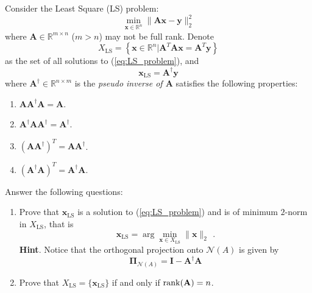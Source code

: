 \documentclass[english,onecolumn]{IEEEtran}
\begin{document}
Consider the Least Square (LS) problem:
\begin{equation}
    \label{eq:LS_problem}
    \min_{\mathbf{x}\in\mathbb{R}^n}\|\mathbf{A}\mathbf{x}-\mathbf{y}\|_2^2
\end{equation}
where $\mathbf{A}\in\mathbb{R}^{m\times n}$ ($m>n$) may not be full rank. Denote 
\begin{equation*}
    X_{\mathrm{LS}}=\left\{\mathbf{x}\in\mathbb{R}^n| \mathbf{A}^T\mathbf{A}\mathbf{x}=\mathbf{A}^T\mathbf{y}\right\}
\end{equation*}
as the set of all solutions to (\ref{eq:LS_problem}), and 
\begin{equation*}
    \mathbf{x}_{\mathrm{LS}}=\mathbf{A}^\dagger \mathbf{y}
\end{equation*}
where $\mathbf{A}^\dagger\in\mathbb{R}^{n\times m}$ is the \emph{pseudo inverse of $\mathbf{A}$} satisfies the following properties:
\begin{enumerate}
    \item $\mathbf{A}\mathbf{A}^\dagger\mathbf{A}=\mathbf{A}$.
    \item $\mathbf{A}^\dagger\mathbf{A}\mathbf{A}^\dagger=\mathbf{A}^\dagger$.
    \item $(\mathbf{A}\mathbf{A}^\dagger)^T=\mathbf{A}\mathbf{A}^\dagger$.
    \item $(\mathbf{A}^\dagger\mathbf{A})^T=\mathbf{A}^\dagger\mathbf{A}$.
\end{enumerate}

Answer the following questions:
\begin{enumerate}
    \item Prove that $\mathbf{x}_{\mathrm{LS}}$ is a solution to (\ref{eq:LS_problem}) and is of minimum $2$-norm in $X_{\mathrm{LS}}$, that is
    \begin{equation*}
        \mathbf{x}_{\mathrm{LS}}=\arg\min_{\mathbf{x}\in X_{\mathrm{LS}}}\|\mathbf{x}\|_2\  \,.
    \end{equation*}
    \textbf{Hint}. Notice that the orthogonal projection onto $\mathcal{N}(A)$ is given by
    \begin{equation*}
        \mathbf{\Pi}_{\mathcal{N}(A)}=\mathbf{I}-\mathbf{A}^\dagger\mathbf{A}
    \end{equation*}
    
    \item Prove that $X_{\mathrm{LS}}=\{\mathbf{x}_{\mathrm{LS}}\}$ if and only if $\mathrm{rank}({\bf A})=n$.
\end{enumerate}
\end{document}
